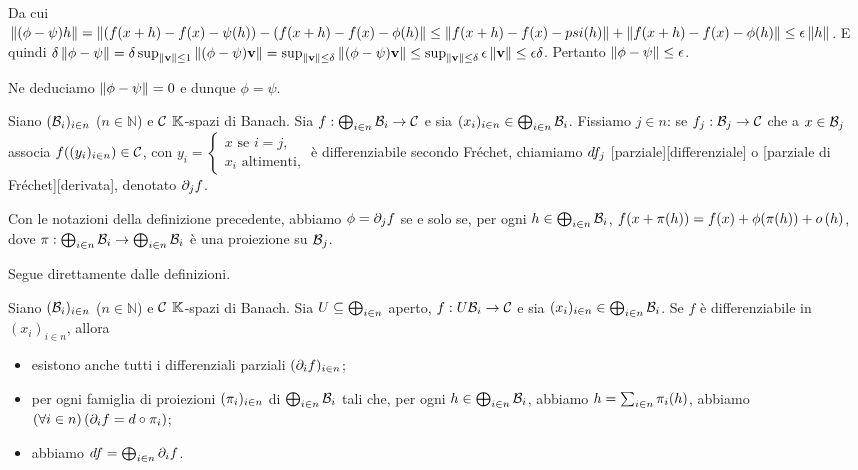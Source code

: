 Da cui $\Norm{(\phi - \psi)h} = \Norm{(f(x + h) - f(x) - \psi(h)) - (f(x + h) - f(x) - \phi(h)} \leq \Norm{f(x + h) - f(x) - psi(h)} + \Norm{f(x + h) - f(x) - \phi(h)} \leq \epsilon \Norm{h}$. E quindi $\delta \Norm{\phi - \psi} = \delta \sup_{\Norm{\Vector} \leq 1} \Norm{(\phi - \psi)\Vector} = \sup_{\Norm{\Vector} \leq \delta} \Norm{(\phi - \psi) \Vector} \leq \sup_{\Norm{\Vector} \leq \delta} \epsilon \Norm{\Vector} \leq \epsilon \delta$. Pertanto $\Norm{\phi - \psi} \leq \epsilon$.
\par Ne deduciamo $\Norm{\phi - \psi} = 0$ e dunque $\phi = \psi$. \EndProof
\begin{Definition}
	Siano $(\mathcal{B}_i)_{i \in n}$ ($n \in \mathbb{N}$) e $\mathcal{C}$ $\mathbb{K}$-spazi di Banach. Sia $f: \bigoplus_{i \in n} \mathcal{B}_i \rightarrow \mathcal{C}$ e sia $(x_i)_{i \in n} \in \bigoplus_{i \in n} \mathcal{B}_i$. Fissiamo $j \in n$: se $f_j: \mathcal{B}_j \rightarrow \mathcal{C}$ che a $x \in \mathcal{B}_j$ associa $f((y_i)_{i \in n}) \in \mathcal{C}$, con $y_i = \begin{cases} x\text{ se }i = j,\\x_i\text{ altimenti,}\end{cases}$ \`e differenziabile secondo Fr\'echet, chiamiamo $\TotalDifferential{f_j}$ [parziale][differenziale] o [parziale di Fr\'echet][derivata], denotato $\PartialDifferential{f}{j}$.
\end{Definition}
\begin{Theorem}
	Con le notazioni della definizione precedente, abbiamo $\phi = \PartialDifferential{f}{j}$ se e solo se, per ogni $h \in \bigoplus_{i \in n} \mathcal{B}_i$, $f(x + \Projection(h)) = f(x) + \phi(\Projection(h)) + \Littleo{h}$, dove $\Projection: \bigoplus_{i \in n} \BanachSpace_i \rightarrow \bigoplus_{i \in n} \BanachSpace_i$ \`e una proiezione su $\mathcal{B}_j$.
\end{Theorem}
\Proof Segue direttamente dalle definizioni. \EndProof
\begin{Theorem}
	Siano $(\mathcal{B}_i)_{i \in n}$ ($n \in \mathbb{N}$) e $\mathcal{C}$ $\mathbb{K}$-spazi di Banach. Sia $U \subseteq \bigoplus_{i \in n}$ aperto, $f: U \mathcal{B}_i \rightarrow \mathcal{C}$ e sia $(x_i)_{i \in n} \in \bigoplus_{i \in n} \mathcal{B}_i$. Se $f$ \`e differenziabile in $(x_i)_{i \in n}$, allora
	\begin{itemize}
		\item esistono anche tutti i differenziali parziali $(\PartialDifferential{f}{i})_{i \in n}$;
		\item per ogni famiglia di proiezioni $(\Projection_i)_{i \in n}$ di $\bigoplus_{i \in n} \mathcal{B}_i$ tali che, per ogni $h \in \bigoplus_{i \in n} \mathcal{B}_i$, abbiamo $h = \sum_{i \in n} \Projection_i(h)$, abbiamo $\ForAll{i \in n}{\PartialDifferential{f}{i} = \TotalDifferential \circ \Projection_i}$;
		\item abbiamo $\TotalDifferential{f} = \bigoplus_{i \in n} \PartialDifferential{f}{i}$.
	\end{itemize}
\end{Theorem}
